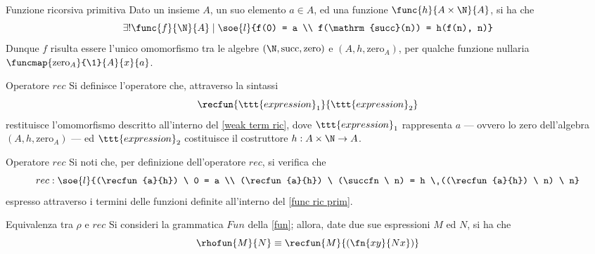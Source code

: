 \documentclass[a4paper, 12pt]{report}
\begin{document}
    \begin{framedlem}[label={func ric prim}]{Funzione ricorsiva primitiva}
        Dato un insieme $A$, un suo elemento $a \in A$, ed una funzione $\func{h}{A \times \N}{A}$, si ha che $$\exists ! \func{f}{\N}{A} \mid \soe{l}{f(0) = a \\ f(\mathrm{succ}(n)) = h(f(n), n)}$$ Dunque $f$ risulta essere l'unico omomorfismo tra le algebre $(\N, \mathrm{succ}, \mathrm{zero})$ e $(A, h, \mathrm{zero}_A)$, per qualche funzione nullaria $\funcmap{\mathrm{zero}_A}{\1}{A}{x}{a}$.
    \end{framedlem}

    \begin{frameddefn}{Operatore $rec$}
        Si definisce  l'operatore che, attraverso la sintassi $$\recfun{\ttt{expression}_1}{\ttt{expression}_2}$$ restituisce l'omomorfismo descritto all'interno del \cref{weak term ric}, dove $\ttt{expression}_1$ rappresenta $a$ --- ovvero lo zero dell'algebra $(A, h, \mathrm{zero}_A)$ --- ed $\ttt{expression}_2$ costituisce il costruttore $h: A \times \N \to A$.
    \end{frameddefn}

    \begin{framedobs}[label={rec obs}]{Operatore $rec$}
        Si noti che, per definizione dell'operatore $rec$, si verifica che $$rec: \soe{l}{(\recfun{a}{h}) \ 0 = a \\ (\recfun{a}{h}) \ (\succfn \ n) = h \ ((\recfun{a}{h}) \ n) \ n}$$ espresso attraverso i termini delle funzioni definite all'interno del \cref{func ric prim}.
    \end{framedobs}

    \begin{framedprop}{Equivalenza tra $\rho$ e $rec$}
        Si consideri la grammatica $Fun$ della \cref{fun}; allora, date due sue espressioni $M$ ed $N$, si ha che $$\rhofun{M}{N} \equiv \recfun{M}{(\fn{xy}{Nx})}$$
    \end{framedprop}

\end{document}
